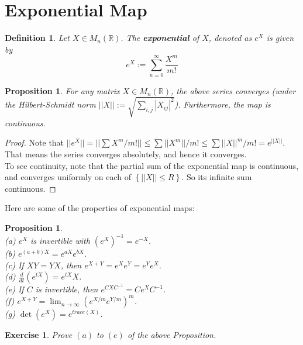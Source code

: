 \documentclass[11pt]{book}
\newtheorem{proposition}[theorem]{Proposition}
\newtheorem{exercise}[theorem]{Exercise}
\newtheorem{definition}[theorem]{Definition}
\newcommand{\bb}[1]{\mathbb{#1}}
\begin{document}
\section{Exponential Map}
\begin{definition}
Let $X \in M_n(\bb{R})$. The \textbf{exponential} of $X$, denoted as $e^X$ is given by
$$e^X := \sum_{n = 0}^{\infty} \frac{X^m}{m!}$$
\end{definition}

\begin{proposition}
For any matrix $X \in M_n(\bb{R})$, the above series converges (under the Hilbert-Schmidt norm $||X|| := \sqrt{\sum_{i,j}|X_{ij}|^2}$). Furthermore, the map is continuous.
\end{proposition}
\begin{proof}
Note that $||e^X|| = ||\sum X^m/m!|| \leq \sum ||X^m||/ m! \leq \sum ||X||^m/m! = e^{||X||}$. That means the series converges absolutely, and hence it converges.\\
To see continuity, note that the partial sum of the exponential map is continuous, and converges uniformly on each of $\left\{||X|| \leq R \right\}$. So its infinite sum continuous.
\end{proof}
Here are some of the properties of exponential maps:
\begin{proposition} \label{tracedet} \mbox{}\\
(a) $e^X$ is invertible with $(e^X)^{-1} = e^{-X}$.\\
(b) $e^{(a+b)X} = e^{aX}e^{bX}$.\\
(c) If $XY = YX$, then $e^{X+Y} = e^Xe^Y = e^Ye^X$.\\
(d) $\frac{d}{dt}(e^{tX}) = e^{tX}X$.\\
(e) If $C$ is invertible, then $e^{CXC^{-1}} = Ce^XC^{-1}$.\\
(f) $e^{X+Y} = \lim_{n \to \infty}(e^{X/m}e^{Y/m})^m$.\\
(g) $\det(e^X) = e^{trace(X)}$.
\end{proposition}
\begin{exercise}
Prove $(a)$ to $(e)$ of the above Proposition.
\end{exercise}
\end{document}
